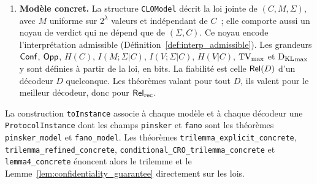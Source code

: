 \begin{sloppypar}
\begin{enumerate}
      l'in\'egalit\'e log-somme \`a l'\'ev\'enement de succ\`es du d\'ecodeur.
\item \textbf{Mod\`ele concret.} La structure \texttt{CLOModel} d\'ecrit la loi jointe de
      $(C, M, \Sigma)$, avec $M$ uniforme sur $2^\lambda$ valeurs et ind\'ependant de $C$~;
      elle comporte aussi un noyau de verdict qui ne d\'epend que de $(\Sigma, C)$. Ce noyau encode
      l'interpr\'etation admissible (D\'efinition~\ref{def:interp_admissible}). Les
      grandeurs $\mathsf{Conf}$, $\mathsf{Opp}$, $H(C)$, $I(M;\Sigma|C)$, $I(V;\Sigma|C)$, $H(V|C)$,
      $\operatorname{TV}_{\max}$ et $\operatorname{D_{\text{KL}}}_{\max}$ y sont d\'efinies \`a partir de la loi, en bits. La
      fiabilit\'e est celle $\mathsf{Rel}(D)$ d'un d\'ecodeur $D$ quelconque. Les th\'eor\`emes valant
      pour tout $D$, ils valent pour le meilleur d\'ecodeur, donc pour $\mathsf{Rel}_{\mathrm{rec}}$.
\end{enumerate}
La construction \texttt{toInstance} associe \`a chaque mod\`ele et \`a chaque d\'ecodeur une
\texttt{ProtocolInstance} dont les champs \texttt{pinsker} et \texttt{fano} sont les
th\'eor\`emes \texttt{pinsker\_model} et \texttt{fano\_model}. Les th\'eor\`emes
\texttt{trilemma\_explicit\_concrete}, \texttt{trilemma\_refined\_concrete},
\texttt{conditional\_CRO\_trilemma\_concrete} et \texttt{lemma4\_concrete} \'enoncent alors
le trilemme et le Lemme~\ref{lem:confidentiality_guarantee} directement sur les lois.


\end{sloppypar}
